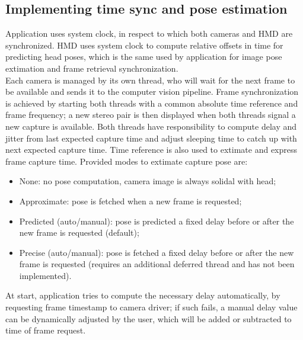 \subsection{Implementing time sync and pose estimation}
\iffalse
TIME\\
Approximate: simply get time before grab new frame\\
Precise-auto: compute image-to-grab delay from frame timestamp (if available)\\
Precise-manual: set image-to-grab delay manually\\
POSE\\
Approximate: get the current pose before grab new frame\\
Predicted: predict the pose in the past by a delay\\
Precise: get the current pose a delay before calling grab()\\
\fi
Application uses system clock, in respect to which both cameras and HMD are synchronized. HMD uses system clock to compute relative offsets in time for predicting head poses, which is the same used by application for image pose extimation and frame retrieval synchronization.\\
Each camera is managed by its own thread, who will wait for the next frame to be available and sends it to the computer vision pipeline. Frame synchronization is achieved by starting both threads with a common absolute time reference and frame frequency; a new stereo pair is then displayed when both threads signal a new capture is available. Both threads have responsibility to compute delay and jitter from last expected capture time and adjust sleeping time to catch up with next expected capture time.
Time reference is also used to extimate and express frame capture time. Provided modes to extimate capture pose are:
\begin{itemize}
\item None: no pose computation, camera image is always solidal with head;
\item Approximate: pose is fetched when a new frame is requested;
\item Predicted (auto/manual): pose is predicted a fixed delay before or after the new frame is requested (default);
\item Precise (auto/manual): pose is fetched a fixed delay before or after the new frame is requested (requires an additional deferred thread and has not been implemented).
\end{itemize}
At start, application tries to compute the necessary delay automatically, by requesting frame timestamp to camera driver; if such fails, a manual delay value can be dynamically adjusted by the user, which will be added or subtracted to time of frame request.
